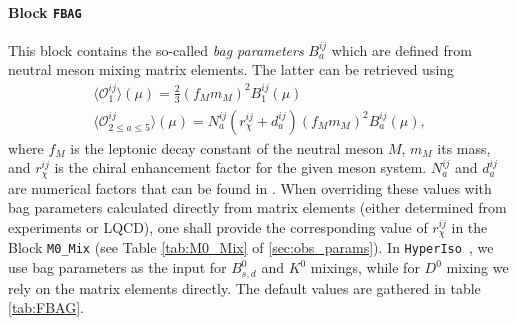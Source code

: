 \documentclass[preprint,11pt]{elsarticle}
\newcommand{\hi}{\texttt{HyperIso}}
\begin{document}
\paragraph{Block \texttt{FBAG}}
This block contains the so-called \textit{bag parameters} $B^{ij}_a$ which are defined from neutral meson mixing matrix elements. The latter can be retrieved using \cite{Aebischer:2020dsw}
\begin{subequations}
    \begin{gather}
        \langle\mathcal{O}^{ij}_1\rangle(\mu)=\frac{2}{3}(f_Mm_M)^2B_1^{ij}(\mu)\\
        \langle\mathcal{O}^{ij}_{2\leq a\leq5}\rangle(\mu)=N_a^{ij}(r_\chi^{ij}+d_a^{ij})(f_Mm_M)^2B_a^{ij}(\mu),
    \end{gather}
\end{subequations}
where $f_M$ is the leptonic decay constant of the neutral meson $M$, $m_M$ its mass, and $r_\chi^{ij}$ is the chiral enhancement factor for the given meson system. $N_a^{ij}$ and $d_a^{ij}$ are numerical factors that can be found in \cite{Aebischer:2020dsw}. When overriding these values with bag parameters calculated directly from matrix elements (either determined from experiments or LQCD), one shall provide the corresponding value of $r_\chi^{ij}$ in the Block \texttt{M0\_Mix} (see Table \ref{tab:M0_Mix} of \ref{sec:obs_params}).\smallbreak
In \hi~, we use bag parameters as the input for $B_{s,d}^0$ and $K^0$ mixings, while for $D^0$ mixing we rely on the matrix elements directly. The default values are gathered in table \ref{tab:FBAG}.
\end{document}
